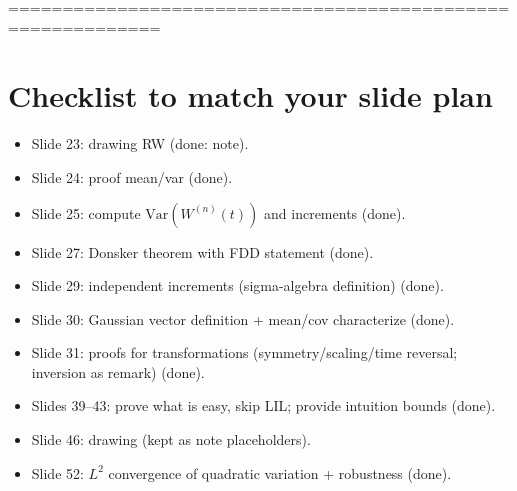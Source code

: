 \documentclass[11pt]{article}
\theoremstyle{definition}
\theoremstyle{remark}
\newcommand{\Var}{\mathrm{Var}}
\begin{document}
============================================================
\section*{Checklist to match your slide plan}
\begin{itemize}
\item Slide 23: drawing RW (done: note).
\item Slide 24: proof mean/var (done).
\item Slide 25: compute $\Var(W^{(n)}(t))$ and increments (done).
\item Slide 27: Donsker theorem with FDD statement (done).
\item Slide 29: independent increments (sigma-algebra definition) (done).
\item Slide 30: Gaussian vector definition + mean/cov characterize (done).
\item Slide 31: proofs for transformations (symmetry/scaling/time reversal; inversion as remark) (done).
\item Slides 39--43: prove what is easy, skip LIL; provide intuition bounds (done).
\item Slide 46: drawing (kept as note placeholders).
\item Slide 52: $L^2$ convergence of quadratic variation + robustness (done).
\end{itemize}
\end{document}
